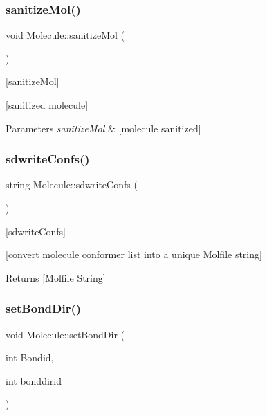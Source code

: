 \subsubsection{\texorpdfstring{sanitize\+Mol()}{sanitizeMol()}}
{\footnotesize\ttfamily void Molecule\+::sanitize\+Mol (\begin{DoxyParamCaption}{ }\end{DoxyParamCaption})}



\mbox{[}sanitize\+Mol\mbox{]} 

\mbox{[}sanitized molecule\mbox{]}


\begin{DoxyParams}{Parameters}
{\em sanitize\+Mol} & \mbox{[}molecule sanitized\mbox{]} \\
\hline
\end{DoxyParams}
\mbox{\label{class_molecule_a4c3f4a82ffe6453c231d78aef0af5efd}} 
\subsubsection{\texorpdfstring{sdwrite\+Confs()}{sdwriteConfs()}}
{\footnotesize\ttfamily string Molecule\+::sdwrite\+Confs (\begin{DoxyParamCaption}{ }\end{DoxyParamCaption})}



\mbox{[}sdwrite\+Confs\mbox{]} 

\mbox{[}convert molecule conformer list into a unique Molfile string\mbox{]} \begin{DoxyReturn}{Returns}
\mbox{[}Molfile String\mbox{]} 
\end{DoxyReturn}
\mbox{\label{class_molecule_a21ccf25eb7aa1fb6c5827a7c6c01d926}} 
\subsubsection{\texorpdfstring{set\+Bond\+Dir()}{setBondDir()}}
{\footnotesize\ttfamily void Molecule\+::set\+Bond\+Dir (\begin{DoxyParamCaption}\item[{int}]{Bondid,  }\item[{int}]{bonddirid }\end{DoxyParamCaption})}



